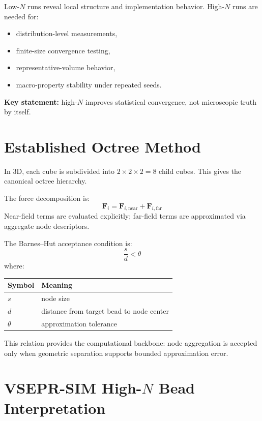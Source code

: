 \documentclass[11pt, a4paper, oneside]{article}
\begin{document}
Low-$N$ runs reveal local structure and implementation behavior. High-$N$ runs are needed for:
\begin{itemize}
  \item distribution-level measurements,
  \item finite-size convergence testing,
  \item representative-volume behavior,
  \item macro-property stability under repeated seeds.
\end{itemize}

\textbf{Key statement:} high-$N$ improves statistical convergence, not microscopic truth by itself.

\section{Established Octree Method}

In 3D, each cube is subdivided into $2\times 2\times 2 = 8$ child cubes.
This gives the canonical octree hierarchy.

The force decomposition is:
\begin{equation}
\mathbf{F}_i = \mathbf{F}_{i,\mathrm{near}} + \mathbf{F}_{i,\mathrm{far}}
\end{equation}
Near-field terms are evaluated explicitly; far-field terms are approximated via aggregate node descriptors.

The Barnes--Hut acceptance condition is:
\begin{equation}
\frac{s}{d} < \theta
\end{equation}
where:
\begin{center}
\begin{tabular}{ll}
\toprule
Symbol & Meaning \\
\midrule
$s$ & node size \\
$d$ & distance from target bead to node center \\
$\theta$ & approximation tolerance \\
\bottomrule
\end{tabular}
\end{center}

This relation provides the computational backbone: node aggregation is accepted only when geometric separation supports bounded approximation error.

\section{VSEPR-SIM High-\texorpdfstring{$N$}{N} Bead Interpretation}
\end{document}
